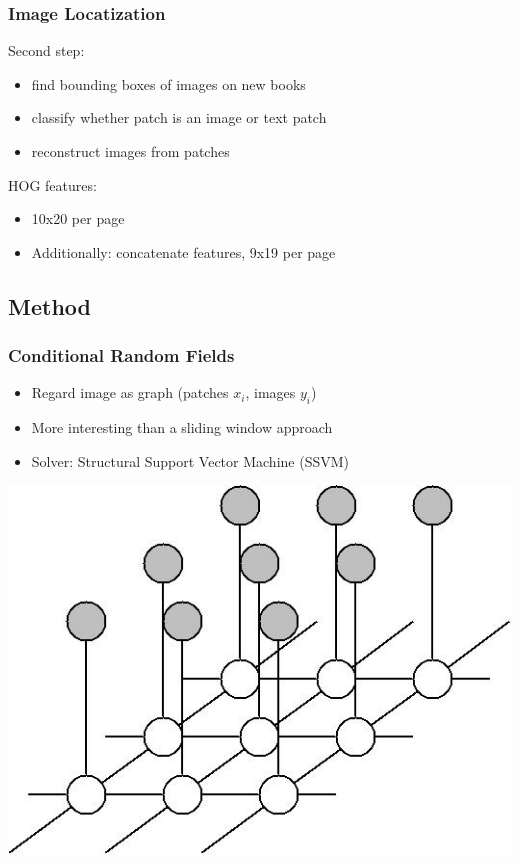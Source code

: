 
\begin{frame}
\frametitle{Image Locatization}
Second step:
\begin{itemize}
\item find bounding boxes of images on new books
\item classify whether patch is an image or text patch
\item reconstruct images from patches
\end{itemize}
HOG features:
\begin{itemize}
\item 10x20 per page
\item Additionally: concatenate features, 9x19 per page
\end{itemize}
\end{frame}

\subsection{Method}
\begin{frame}
\frametitle{Conditional Random Fields}
\begin{itemize}
\item Regard image as graph (patches $x_i$, images $y_i$)
\item More interesting than a sliding window approach
\item Solver: Structural Support Vector Machine (SSVM)
\end{itemize}
\includegraphics[width=.5\paperwidth]{resources/crf}
\end{frame}


